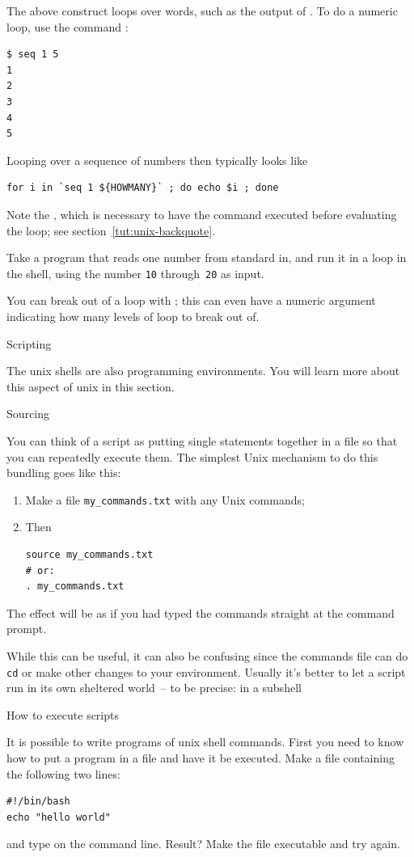 The above construct loops over words, such as the output of
. To do a numeric loop, use the command :
\begin{lstlisting}
$ seq 1 5
1
2
3
4
5
\end{lstlisting}
Looping over a sequence of numbers then typically looks like
\begin{lstlisting}
for i in `seq 1 ${HOWMANY}` ; do echo $i ; done
\end{lstlisting}
Note the , which is necessary to have the 
command executed before evaluating the loop;
see section~\ref{tut:unix-backquote}.

\begin{exercise}
  Take a program that reads one number from standard in, and run it in a loop in the shell,
  using the number \texttt{10} through~\texttt{20} as input.
\end{exercise}

You can break out of a loop with ;
this can even have a numeric argument indicating
how many levels of loop to break out of.

 {Scripting}
\label{sec:unix-script}

The unix shells are also programming environments. You will learn more
about this aspect of unix in this section.

 {Sourcing}

You can think of a script as putting single statements
together in a file so that you can repeatedly execute them.
The simplest Unix mechanism to do this bundling goes like this:
\begin{enumerate}
\item Make a file \lstinline{my_commands.txt} with any Unix commands;
\item Then
\begin{lstlisting}
source my_commands.txt
# or:
. my_commands.txt
\end{lstlisting}
\end{enumerate}
The effect will be as if you had typed the commands
straight at the command prompt.

While this can be useful, it can also be confusing
since the commands file can do \lstinline{cd}
or make other changes to your environment.
Usually it's better to let a script run
in its own sheltered world~-- to be precise: in a subshell

 {How to execute scripts}
\label{sec:shell-scripting}

It is possible to write programs of unix shell commands. First you
need to know how to put a program in a file and have it be
executed. Make a file  containing the following two lines:
\begin{lstlisting}
#!/bin/bash
echo "hello world"
\end{lstlisting}
and type  on the command line. Result?
Make the file executable and try again.

